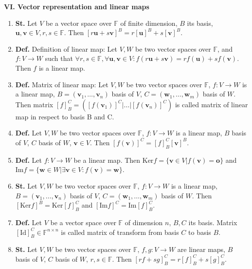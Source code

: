 \documentclass{article}
\newcommand{\<}{\left<}
\renewcommand{\>}{\right>}
\newcommand{\im}{\text{Im}}
\renewcommand{\ker}{\text{Ker}}
\newcommand{\F}{\mathbb{F}}
\newcommand{\define}{\textbf{Def. }}
\newcommand{\state}{\textbf{St. }}
\begin{document}
\begin{multicols}{3}
\begin{enumerate}[itemsep=2pt, topsep=2pt, partopsep=2pt, parsep=2pt]
    \end{enumerate}

    \textbf{VI. Vector representation and linear maps}

    \begin{enumerate}[itemsep=2pt, topsep=2pt, partopsep=2pt, parsep=2pt]

        \item \state Let $V$ be a vector space over $\F$ of finite dimension, $B$ its basis, $\bm u,\bm v\in V,r,s\in\F$. Then $\left[r\bm u+s\bm v\right]^B=r\left[\bm u\right]^B+s\left[\bm v\right]^B$.
        \item \define Definition of linear map: Let $V,W$ be two vector spaces over $\F$, and $f:V\to W$ such that $\forall r,s\in\F,\forall\bm u,\bm v\in V:f\left(r\bm u+s\bm v\right)=rf\left(\bm u\right)+sf\left(\bm v\right)$. Then $f$ is a linear map.
        \item \define Matrix of linear map: Let $V,W$ be two vector spaces over $\F$, $f:V\to W$ is a linear map, $B=(\bm v_1,\ldots,\bm v_n)$ basis of $V$, $C=(\bm w_1,\ldots,\bm w_m)$ basis of $W$. Then matrix $\left[f\right]_B^C=\left(\left[f\left(\bm v_1\right)\right]^C|\ldots|\left[f\left(\bm v_n\right)\right]^C\right)$ is called matrix of linear map in respect to basis B and C.
        \item \define Let $V,W$ be two vector spaces over $\F$, $f:V\to W$ is a linear map, $B$ basis of $V$, $C$ basis of $W$, $\bm v\in V$. Then $\left[f\left(\bm v\right)\right]^C=\left[f\right]_B^C\left[\bm v\right]^B$.
        \item \define Let $f:V\to W$ be a linear map. Then $\ker f=\{\bm v\in V|f\left(\bm v\right)=\bm o\}$ and $\im f=\{\bm w\in W|\exists\bm v\in V:f\left(\bm v\right)=\bm w\}$.
        \item \state Let $V,W$ be two vector spaces over $\F$, $f:V\to W$ is a linear map, $B=(\bm v_1,\ldots,\bm v_n)$ basis of $V$, $C=(\bm w_1,\ldots,\bm w_m)$ basis of $W$. Then $\left[\ker f\right]^B=\ker\left[f\right]_B^C$ and $\left[\im f\right]^C=\im\left[f\right]_B^C$.
        \item \define Let $V$ be a vector space over $\F$ of dimension $n$, $B,C$ its basis. Matrix $\left[\text{Id}\right]_B^C\in\F^{n\times n}$ is called matrix of transform from basis $C$ to basis $B$.
        \item \state Let $V,W$ be two vector spaces over $\F$, $f,g:V\to W$ are linear maps, $B$ basis of $V$, $C$ basis of $W$, $r,s\in\F$. Then $\left[rf+sg\right]_B^C=r\left[f\right]_B^C+s\left[g\right]_B^C$.

\end{enumerate}
\end{multicols}
\end{document}
